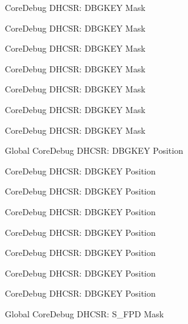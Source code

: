 \begin{DoxyRefList}
\label{deprecated__deprecated000378}%
%
Core\+Debug DHCSR\+: DBGKEY Mask 

\label{deprecated__deprecated000559}%
%
Core\+Debug DHCSR\+: DBGKEY Mask 

\label{deprecated__deprecated000106}%
%
Core\+Debug DHCSR\+: DBGKEY Mask 

\label{deprecated__deprecated000245}%
%
Core\+Debug DHCSR\+: DBGKEY Mask 

\label{deprecated__deprecated000457}%
%
Core\+Debug DHCSR\+: DBGKEY Mask 

\label{deprecated__deprecated000160}%
%
Core\+Debug DHCSR\+: DBGKEY Mask 

\label{deprecated__deprecated000006}%
%
Core\+Debug DHCSR\+: DBGKEY Mask  
\item[Global \doxylink{group___c_m_s_i_s___core_debug_gac91280edd0ce932665cf75a23d11d842}{Core\+Debug\+\_\+\+DHCSR\+\_\+\+DBGKEY\+\_\+\+Pos} ]\label{deprecated__deprecated000105}%
%
Core\+Debug DHCSR\+: DBGKEY Position 

\label{deprecated__deprecated000005}%
%
Core\+Debug DHCSR\+: DBGKEY Position 

\label{deprecated__deprecated000377}%
%
Core\+Debug DHCSR\+: DBGKEY Position 

\label{deprecated__deprecated000558}%
%
Core\+Debug DHCSR\+: DBGKEY Position 

\label{deprecated__deprecated000159}%
%
Core\+Debug DHCSR\+: DBGKEY Position 

\label{deprecated__deprecated000244}%
%
Core\+Debug DHCSR\+: DBGKEY Position 

\label{deprecated__deprecated000456}%
%
Core\+Debug DHCSR\+: DBGKEY Position 

\label{deprecated__deprecated000301}%
%
Core\+Debug DHCSR\+: DBGKEY Position  
\item[Global \doxylink{group___c_m_s_i_s___s_c_b_gae37ad624177fe2d3298fd32d528805aa}{Core\+Debug\+\_\+\+DHCSR\+\_\+\+S\+\_\+\+FPD\+\_\+\+Msk} ]\label{deprecated__deprecated000567}%
%
Core\+Debug DHCSR\+: S\+\_\+\+FPD Mask 


\end{DoxyRefList}
